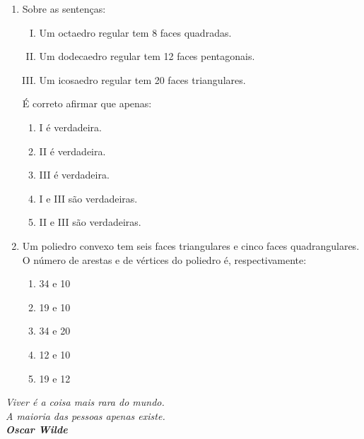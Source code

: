 \documentclass[twocolumn,oneside,a4paper,12pt]{article}
\begin{document}
\begin{enumerate}
\item  Sobre as sentenças:
\begin{enumerate}[I.]
\item Um octaedro regular tem 8 faces quadradas.
\item Um dodecaedro regular tem 12 faces pentagonais.
\item Um icosaedro regular tem 20 faces triangulares.
\end{enumerate}

É correto afirmar que apenas:
\begin{enumerate}
\item I é verdadeira.
\item II é verdadeira.
\item III é verdadeira.
\item I e III são verdadeiras.
\item II e III são verdadeiras.
\end{enumerate}

\item  Um poliedro convexo tem seis faces triangulares e cinco faces quadrangulares. O número de arestas e de vértices do poliedro é, respectivamente:
\begin{enumerate}
\item 34 e 10
\item 19 e 10
\item 34 e 20
\item 12 e 10
\item 19 e 12
\end{enumerate}
\end{enumerate}

\begin{flushright}
\textit{Viver é a coisa mais rara do mundo.\\A maioria das pessoas apenas existe.\\\textbf{Oscar Wilde}}
\end{flushright}
\end{document}

